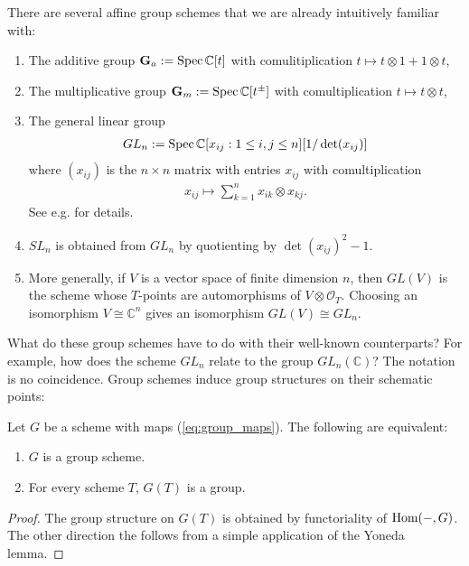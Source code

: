 \documentclass[12pt]{ociamthesis}  %
\begin{document}
\begin{example}\label{ex:group_schemes}
  There are several affine group schemes that we are already
  intuitively familiar with:
  \begin{enumerate}
    \item The additive group $\mathbf{G}_a := \operatorname{Spec}\mathbb C[t]$ with
          comulitiplication $t\mapsto t\otimes 1 + 1\otimes t$,
    \item The multiplicative group $\mathbf{G}_m := \operatorname{Spec}\mathbb C[t^\pm]$
          with comultiplication $t\mapsto t\otimes t$,
    \item The general linear group
          \begin{align*}
            GL_n := \operatorname{Spec}\mathbb C[x_{ij} : 1\leq i,j\leq n][1/\det(x_{ij})]
          \end{align*}
          where $(x_{ij})$ is the $n\times n$ matrix with entries $x_{ij}$
          with comultiplication
          \begin{align*}
            x_{ij} \mapsto \sum_{k=1}^n x_{ik}\otimes x_{kj}.
          \end{align*}
          See e.g. \cite[\href{https://stacks.math.columbia.edu/tag/022W}{Tag 022W}]{stacks-project} for details.
    \item $SL_n$ is obtained from $GL_n$ by quotienting by $\det(x_{ij})^2-1$.
    \item More generally, if $V$ is a vector space of finite dimension $n$, then
          $GL(V)$ is the scheme whose $T$-points are automorphisms of
          $V\otimes\mathscr O_T$. Choosing an isomorphism
          $V\cong\mathbb C^n$ gives an isomorphism $GL(V)\cong GL_n$.
  \end{enumerate}
\end{example}

What do these group schemes have to do with their well-known
counterparts? For example, how does the scheme $GL_n$ relate to the
group $GL_n(\mathbb{C})$? The notation is no coincidence.
Group schemes induce group structures on their schematic points:
\begin{lemma}\label{lem:group_yoneda}
  Let $G$ be a scheme with maps (\ref{eq:group_maps}). The following
  are equivalent:
  \begin{enumerate}
    \item $G$ is a group scheme.
    \item For every scheme $T$, $G(T)$ is a group.
  \end{enumerate}
  \begin{proof}
    The group structure on $G(T)$ is obtained by functoriality of
    $\operatorname{Hom}(-,G)$. The other direction the follows from a simple
    application of the Yoneda lemma.
  \end{proof}
\end{lemma}
\end{document}
